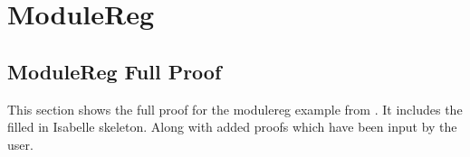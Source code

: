 \begin{figure}[H]
    \hfill
    \hfill
    \hfill
\end{figure}


\section{ModuleReg}
\label{app:moduleregfullproof}

\subsection{ModuleReg Full Proof}

This section shows the full proof for the modulereg example from
\cite{essenceofz}. 
It includes the filled in Isabelle skeleton. 
Along with added proofs which have been input by the user.

